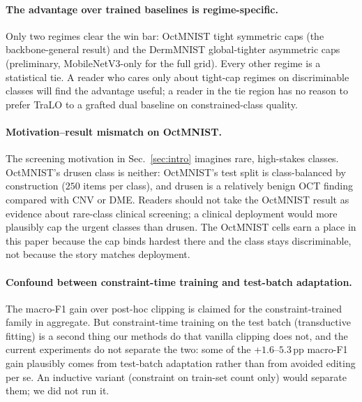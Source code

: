 \documentclass[10pt]{article}
\newcommand{\del}[1]{{\color{red}\sout{#1}}}
\begin{document}
\paragraph{The advantage over trained baselines is regime-specific.}
Only two regimes clear the win bar: OctMNIST tight symmetric caps (the
backbone-general result) and the DermMNIST global-tighter asymmetric caps
(preliminary, MobileNetV3-only for the full grid). Every other regime is
a statistical tie. A reader who cares only about tight-cap regimes on
discriminable classes will find the advantage useful; a reader in the
tie region has no reason to prefer TraLO to a grafted dual baseline on
constrained-class quality.

\paragraph{Motivation--result mismatch on OctMNIST.}
The screening motivation in Sec.~\ref{sec:intro} imagines rare, high-stakes
classes. OctMNIST's drusen class is neither: OctMNIST's test split is
class-balanced by construction ($250$ items per class), and drusen is a
relatively benign OCT finding compared with CNV or DME. Readers should
not take the OctMNIST result as evidence about rare-class clinical
screening; a clinical deployment would more plausibly cap the urgent
classes than drusen. The OctMNIST cells earn a place in this paper
because the cap binds hardest there and the class stays discriminable,
not because the story matches deployment.

\paragraph{Confound between constraint-time training and test-batch
adaptation.} The macro-F1 gain over post-hoc clipping is claimed for the
constraint-trained family in aggregate. But constraint-time training on
the test batch (transductive fitting) is a second thing our methods do
that vanilla clipping does not, and the current experiments do not
separate the two: some of the +$1.6$--$5.3$\,pp macro-F1 gain plausibly
comes from test-batch adaptation rather than from avoided editing per
se. An inductive variant (constraint on train-set count only) would
separate them; we did not run it.

\end{document}

